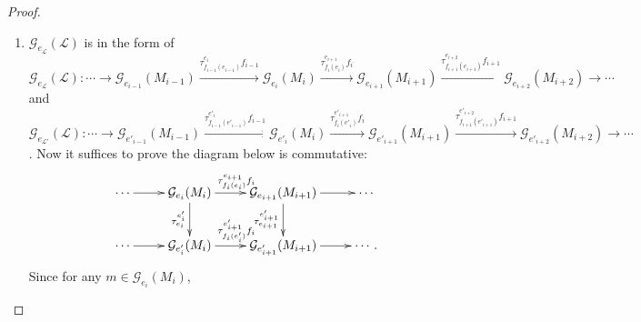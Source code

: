 \documentclass[11pt, twoside]{article}
\begin{document}
\begin{proof}
\begin{enumerate}
    \item[(i)] $\mathcal{G}_{e_\mathcal{L}}(\mathcal{L})$ is in the form of $\mathcal{G}_{e_\mathcal{L}}(\mathcal{L}): \cdots \to \mathcal{G}_{e_{i-1}}(M_{i-1}) \xrightarrow{\tau^{e_{i}}_{f_{i-1}(e_{i-1})}f_{i-1}} \mathcal{G}_{e_{i}}(M_{i}) \xrightarrow{\tau^{e_{i+1}}_{f_{i}(e_{i})}f_i} \mathcal{G}_{e_{i+1}}(M_{i+1}) \xrightarrow{\tau^{e_{i+2}}_{f_{i+1}(e_{i+1})}f_{i+1}} \mathcal{G}_{e_{i+2}}(M_{i+2}) \to \cdots$ and $ \mathcal{G}_{e_\mathcal{L'}}(\mathcal{L}): \cdots \to \mathcal{G}_{e'_{i-1}}(M_{i-1}) \xrightarrow{\tau^{e'_{i}}_{f_{i-1}(e'_{i-1})}f_{i-1}} \mathcal{G}_{e'_{i}}(M_{i}) \xrightarrow{\tau^{e'_{i+1}}_{f_{i}(e'_{i})}f_i} \mathcal{G}_{e'_{i+1}}(M_{i+1}) \xrightarrow{\tau^{e'_{i+2}}_{f_{i+1}(e'_{i+1})}f_{i+1}} \mathcal{G}_{e'_{i+2}}(M_{i+2}) \to \cdots$. Now it suffices to prove the diagram below is commutative:
    $$ \xymatrix{\cdots \ar[r] & \mathcal{G}_{e_{i}}(M_{i}) \ar[d]_{\tau^{e'_i}_{e_i}} \ar[r]^{\tau^{e_{i+1}}_{f_{i}(e_{i})}f_i} & \mathcal{G}_{e_{i+1}}(M_{i+1}) \ar[d]_{\tau^{e'_{i+1}}_{e_{i+1}}} \ar[r] & \cdots\\
  \cdots \ar[r] & \mathcal{G}_{e'_{i}}(M_{i}) \ar[r]^{\tau^{e'_{i+1}}_{f_{i}(e'_{i})}f_i} & \mathcal{G}_{e'_{i+1}}(M_{i+1}) \ar[r] & \cdots.} $$
  Since for any $m\in \mathcal{G}_{e_{i}}(M_{i})$,


\end{enumerate}
\end{proof}
\end{document}
